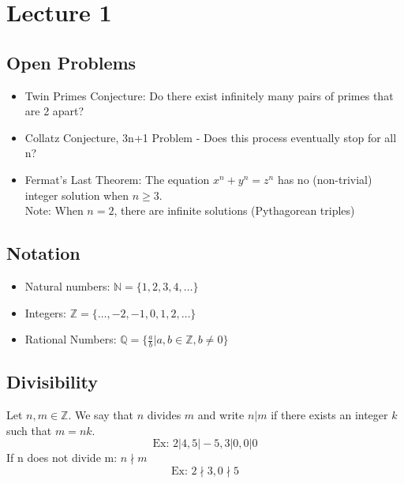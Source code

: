 \chapter{Lecture 1}
\date{August 27, 2024}

\section{Open Problems}
    \begin{itemize}
        \item Twin Primes Conjecture: Do there exist infinitely many pairs of primes 
        that are 2 apart?
        \item Collatz Conjecture, 3n+1 Problem - Does this process eventually stop for all n?
        \item Fermat's Last Theorem: The equation $x^n+y^n=z^n$ has no (non-trivial)
        integer solution when $n\geq 3$. \\
            Note: When $n=2$, there are infinite solutions (Pythagorean triples)
    \end{itemize}

\section{Notation}
    \begin{itemize}
        \item Natural numbers: $\mathbb{N} = \{1,2,3,4,\dots\}$
        \item Integers: $\mathbb{Z} = \{\dots,-2,-1,0,1,2,\dots\}$
        \item Rational Numbers: $\mathbb{Q} = \{\frac{a}{b}|a,b\in\mathbb{Z}, b\neq 0\}$
    \end{itemize}

\section{Divisibility}
    \begin{definition}
        Let $n,m\in\mathbb{Z}$. We say that $n$ divides $m$ and write $n|m$ if there exists
        an integer $k$ such that $m=nk$. 
        \[ \text{Ex: } 2|4, 5|-5, 3|0, 0|0\]
        If n does not divide m: $n\nmid m$
        \[ \text{Ex: } 2\nmid 3, 0\nmid 5\]
    \end{definition}

